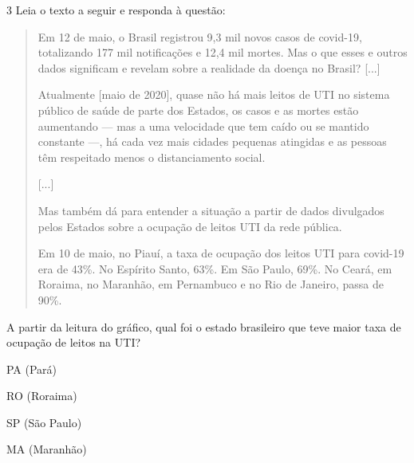 \num{3} Leia o texto a seguir e responda à questão:

\begin{quote}
Em 12 de maio, o Brasil registrou 9,3 mil novos casos de covid-19,
totalizando 177 mil notificações e 12,4 mil mortes. Mas o que esses e
outros dados significam e revelam sobre a realidade da doença no Brasil?
{[}...{]}

Atualmente {[}maio de 2020{]}, quase não há mais leitos de UTI no
sistema público de saúde de parte dos Estados, os casos e as mortes
estão aumentando --- mas a uma velocidade que tem caído ou se mantido
constante ---, há cada vez mais cidades pequenas atingidas e as pessoas
têm respeitado menos o distanciamento social.

{[}...{]}

Mas também dá para entender a situação a partir de dados divulgados
pelos Estados sobre a ocupação de leitos UTI da rede pública.

Em 10 de maio, no Piauí, a taxa de ocupação dos leitos UTI para covid-19
era de 43\%. No Espírito Santo, 63\%. Em São Paulo, 69\%. No Ceará, em
Roraima, no Maranhão, em Pernambuco e no Rio de Janeiro, passa de 90\%.


\end{quote}

A partir da leitura do gráfico, qual foi o estado brasileiro que teve
maior taxa de ocupação de leitos na UTI?

\begin{escolha}
\item PA (Pará)

\item RO (Roraima)

\item SP (São Paulo)

\item MA (Maranhão)
\end{escolha}


